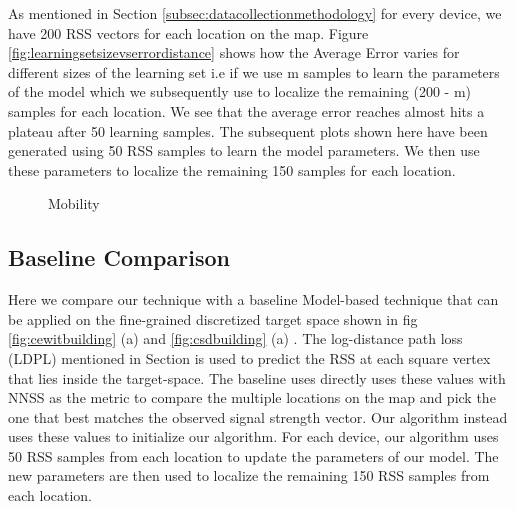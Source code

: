 \documentclass{Localization-PaperWriteupDraft}
\begin{document}
As mentioned in Section \ref{subsec:datacollectionmethodology} for every device, we
have 200 RSS vectors for each location on the map. Figure
\ref{fig:learningsetsizevserrordistance} shows how the Average Error varies for
different sizes of the learning set i.e if we use m samples to learn the
parameters of the model which we subsequently use to localize the
remaining (200 - m) samples for each location. We see that the average error reaches almost
hits a plateau after 50 learning samples. The subsequent plots shown here
have been generated using 50 RSS samples to learn the model parameters. We
then use these parameters to localize the remaining 150 samples for each location.

\begin{figure}
	\centering
	\caption{Mobility}
	\label{fig:mobility}
\end{figure}

\subsection{Baseline Comparison}
\label{subsec:baselinecomparison}


Here we compare our technique with a baseline Model-based technique that
can be applied on the fine-grained discretized target space shown in fig
\ref{fig:cewitbuilding} (a) and \ref{fig:csdbuilding} (a) . The
log-distance path loss (LDPL) mentioned in Section
\label{subsec:radiopropagation} is used to predict the RSS at each
square vertex that lies inside the target-space. The baseline uses directly
uses these values with NNSS as the metric to compare the multiple locations on the map 
and pick the one that best matches the observed signal strength vector.
Our algorithm instead uses these values to initialize our algorithm.
For each device, our algorithm uses 50 RSS samples from each location to
update the parameters of our model.  The new parameters are then used to
localize the remaining 150 RSS samples from each location.
\end{document}
